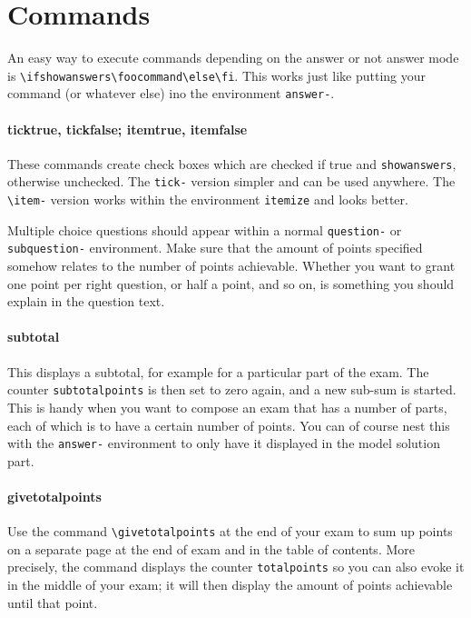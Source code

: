 \documentclass[a4paper]{scrartcl}
\begin{document}
\section*{Commands}

An easy way to execute commands depending on the answer or not answer mode is \verb|\ifshowanswers\foocommand\else\fi|. This works just like putting your command (or whatever else) ino the environment \verb|answer-|.

\paragraph{ticktrue, tickfalse; itemtrue, itemfalse}

These  commands create check boxes which are checked if true and \verb|showanswers|, otherwise unchecked. The \verb|tick-| version  simpler and can be used anywhere. The \verb|\item-| version works within the environment \verb|itemize| and looks better.  

Multiple choice questions should appear within a normal \verb|question-| or \verb|subquestion-| environment. Make sure that the amount of points specified somehow relates to the number of points achievable. Whether you want to grant one point per right question, or half a point, and so on, is something you should explain in the question text. 

\paragraph{subtotal}

This displays a subtotal, for example for a particular part of the exam. The counter \verb|subtotalpoints| is then set to zero again, and a new sub-sum is started.  This is handy when you want to compose an exam that has a number of parts, each of which is to have a certain number of points. You can of course nest this with the \verb|answer-| environment to only have it displayed in the model solution part. 


 

\paragraph{givetotalpoints}

Use the command \verb|\givetotalpoints| at the end of your exam to sum up points on a separate page at the end of exam and in the table of contents. More precisely, the command displays the counter \verb|totalpoints| so you can also evoke it in the middle of your exam; it will then display the amount of points achievable until that point.
\end{document}
